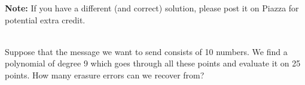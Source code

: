\documentclass[]{article}
\renewcommand{\answer}[1]{{\color{mydarkblue}\textbf{Solution:}#1}}
\begin{document}
\begin{qunlist}
{{\begin{enumerate}
\end{enumerate}




%
%
%
%

\textbf{Note:} If you have a different (and correct) solution, please post it on Piazza for potential extra credit.

}}\fi



 \\ %
Suppose that the message we want to send consists of 10 numbers. We find a polynomial of degree 9 which goes through all these points and evaluate it on 25 points. How many erasure errors can we recover from?


\end{qunlist}
\end{document}
